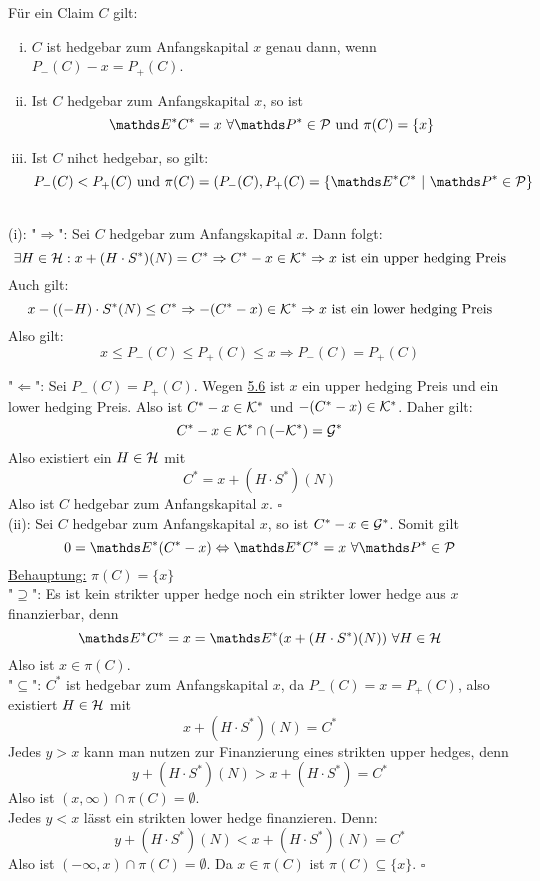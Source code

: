 Für ein Claim $C$ gilt:
\begin{enumerate}[(i)]
	\item $C$ ist hedgebar zum Anfangskapital $x$ genau dann, wenn $P_-(C)-x=P_+(C)$.
	\item Ist $C$ hedgebar zum Anfangskapital $x$, so ist
	\[
	\E^*C^*=x~\forall \Pw^*\in\mc{P} \text{ und } \pi(C)=\{x\}
	\]
	\item Ist $C$ nihct hedgebar, so gilt:
	\[
	P_-(C)<P_+(C)\text{ und } \pi(C)=(P_-(C),P_+(C)=\penbrace{\E^*C^*~|~\Pw^*\in\mc{P}}
	\]
\end{enumerate}

\\
(i): "$\Rightarrow$":
Sei $C$ hedgebar zum Anfangskapital $x$.
Dann folgt:
\[
\exists H\in\mathcal{H}: x+(H\cdot S^*)(N)=C^* \Rightarrow C^*-x\in \mathcal{K}^* \Rightarrow x\text{ ist ein upper hedging Preis}
\]
Auch gilt:
\[
x-((-H)\cdot S^*(N)\le C^* \Rightarrow -(C^*-x)\in\mathcal{K}^* \Rightarrow x\text{ ist ein lower hedging Preis}
\]
Also gilt:
\[
x\le P_-(C)\le P_+(C)\le x \Rightarrow P_-(C)=P_+(C)
\]

"$\Leftarrow$":
Sei $P_-(C)=P_+(C)$.
Wegen \hyperref[sub:]{5.6} ist $x$ ein upper hedging Preis und ein lower hedging Preis.
Also ist $C^*-x\in \mathcal{K}^*$ und $-(C^*-x)\in\mathcal{K}^*$.
Daher gilt:
\[
C^*-x\in \mathcal{K}^*\cap (-\mathcal{K^*})=\mathcal{G}^*
\]
Also existiert ein $H\in\mathcal{H}$ mit 
\[
C^*= x+(H\cdot S^*)(N)
\]
Also ist $C$ hedgebar zum Anfangskapital $x$.
\hfill $\square$\\

(ii):
Sei $C$ hedgebar zum Anfangskapital $x$, so ist $C^*-x\in\mathcal{G}^*$.
Somit gilt
\[
0=\E^*(C^*-x) \Leftrightarrow \E^*C^*=x~\forall \Pw^*\in\mc{P}
\]
\uline{Behauptung:}
$\pi(C)=\{x\}$\\
"$\supseteq$":
Es ist kein strikter upper hedge noch ein strikter lower hedge aus $x$ finanzierbar, denn 
\[
\E^*C^* = x =  \E^*(x+(H\cdot S^*)(N))~\forall H\in\mc{H}
\]
Also ist $x\in\pi(C)$.\\

"$\subseteq$":
$C^*$ ist hedgebar zum Anfangskapital $x$, da $P_-(C)=x=P_+(C)$, also existiert $H\in\mathcal{H}$ mit
\[
x+(H\cdot S^*)(N)=C^*
\]
Jedes $y>x$ kann man nutzen zur Finanzierung eines strikten upper hedges, denn 
\[
y+(H\cdot S^*)(N)>x+(H\cdot S^*)=C^*
\]
Also ist $(x,\infty)\cap \pi(C)=\emptyset$.\\
Jedes $y<x$ lässt ein strikten lower hedge finanzieren.
Denn:
\[
y+(H\cdot S^*)(N)<x+(H\cdot S^*)(N)=C^*
\]
Also ist $(-\infty,x)\cap\pi(C)=\emptyset$.
Da $x\in\pi(C)$ ist $\pi(C)\subseteq \{x\}$.
\hfill $\square$\\


